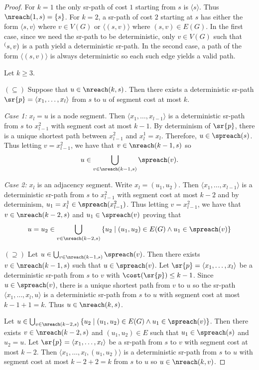 \begin{proof}
For $k = 1$ the only sr-path of cost $1$ starting from $s$ is $\langle s \rangle$. Thus $\nreach(1, s) = \{ s \}$.
For $k = 2$, a sr-path of cost $2$ starting at $s$ has either the form $\langle s, v \rangle$ where
$v \in V(G)$ or $\langle (s, v) \rangle$ where $(s, v) \in E(G)$. In the first case, since we need the sr-path to
be deterministic, only $v \in V(G)$ such that $\sp(s, v)$ is a path yield a deterministic sr-path. In the second case,
a path of the form $\langle (s, v) \rangle$ is always deterministic so each such edge yields a valid path.

Let $k \geq 3$. 

$(\subseteq)$ Suppose that $u \in \nreach(k, s)$. Then there exists a deterministic sr-path 
$\sr{p} = \langle x_1, \ldots, x_l \rangle$ from $s$ to $u$ of segment cost at most $k$.

\emph{Case 1:} $x_l = u$ is a node segment.
Then $\langle x_1, \ldots, x_{l - 1} \rangle$ is a deterministic
sr-path from $s$ to $x^2_{l - 1}$ with segment cost at most $k - 1$. By determinism of $\sr{p}$, there is a unique shortest path
between $x^2_{l - 1}$ and $x^1_l = x_l$. Therefore, $u \in \spreach(s)$. Thus letting $v = x^2_{l - 1}$, we have that
$v \in \nreach(k - 1, s)$ so
$$
u \in \bigcup_{v \in \nreach(k - 1, s)} \spreach(v).
$$

\emph{Case 2:} $x_l$ is an adjacency segment.
Write $x_l = (u_1, u_2)$. Then $\langle x_1, \ldots, x_{l - 1} \rangle$ is a deterministic sr-path 
from $s$ to $x^2_{l - 1}$ with segment cost at most $k - 2$ and by determinism, 
$u_1 = x^1_l \in \spreach(x^2_{l - 1})$. Thus letting $v = x^2_{l - 1}$,
we have that $v \in \nreach(k - 2, s)$ and $u_1 \in \spreach(v)$ proving that
$$
u = u_2 \in \bigcup_{v \in \nreach(k - 2, s)}  \left\{ u_2 \mid (u_1, u_2) \in E(G) \wedge u_1 \in \spreach(v) \right\}
$$

$(\supseteq)$
Let $u \in \bigcup_{v \in \nreach(k - 1, s)} \spreach(v)$. Then there exists $v \in \nreach(k - 1, s)$
such that $u \in \spreach(v)$. Let $\sr{p} = \langle x_1, \ldots, x_l \rangle$ be a deterministic sr-path from $s$ to $v$ with
$\cost(\sr{p}) \leq k - 1$. Since $u \in \spreach(v)$, there is a unique shortest path from $v$ to $u$ so the
sr-path $\langle x_1, \ldots, x_l, u \rangle$ is a deterministic sr-path from $s$ to $u$ with segment cost
at most $k - 1 + 1 = k$. Thus $u \in \nreach(k, s)$.

Let $u \in \bigcup_{v \in \nreach(k - 2, s)}  \left\{ u_2 \mid (u_1, u_2) \in E(G) \wedge u_1 \in \spreach(v) \right\}$. 
Then there exists $v \in \nreach(k - 2, s)$ and $(u_1, u_2) \in E$ such that $u_1 \in \spreach(s)$ and
$u_2 = u$. Let $\sr{p} = \langle x_1, \ldots, x_l \rangle$ be a sr-path from $s$ to $v$ with segment
cost at most $k - 2$. Then $\langle x_1, \ldots, x_l, (u_1, u_2) \rangle$ is a deterministic sr-path from $s$ to $u$ with
segment cost at most $k - 2 + 2 = k$ from $s$ to $u$ so $u \in \nreach(k, v)$.
\end{proof}

